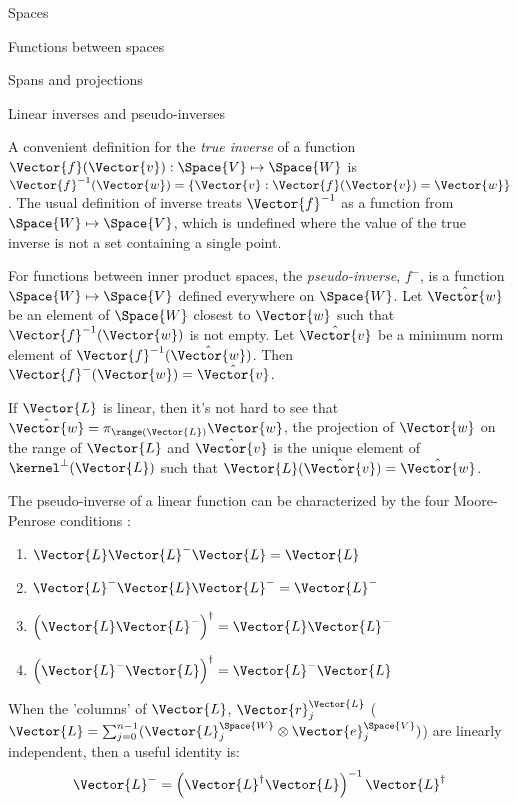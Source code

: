 \begin{plSection}{Spaces}
\begin{plSection}{Functions between spaces}
\begin{plSection}{Spans and projections}
\end{plSection}%
\begin{plSection}{Linear inverses and pseudo-inverses}
\label{sec:Linear-inverses-and-pseudo-inverses}

A convenient definition for the \textit{true inverse}
of a function $\Vector{f}(\Vector{v}):\Space{V} \mapsto \Space{W}$ is
$\Vector{f}^{-1}(\Vector{w}) = \left\{ \Vector{v} : \Vector{f}(\Vector{v}) = \Vector{w} \right\}$.
The usual definition of inverse treats $\Vector{f}^{-1}$
as a function from $\Space{W} \mapsto \Space{V}$,
which is undefined where the value of the true
inverse is not a set containing a single point.

For functions between inner product spaces,
the \textit{pseudo-inverse}, $f^{-}$, is a function $\Space{W} \mapsto \Space{V}$
defined everywhere on $\Space{W}$.
Let $\hat{\Vector{w}}$ be an element of $\Space{W}$ closest to $\Vector{w}$
such that $\Vector{f}^{-1}(\Vector{w})$ is not empty.
Let $\hat{\Vector{v}}$ be a minimum norm element of $\Vector{f}^{-1}(\hat{\Vector{w}})$.
Then $\Vector{f}^{-}(\Vector{w}) = \hat{\Vector{v}}$.

If $\Vector{L}$ is linear, then it's not hard to see that
$\hat{\Vector{w}} = \pi_{\range(\Vector{L})} \Vector{w}$, the projection of $\Vector{w}$
on the range of $\Vector{L}$
and
$\hat{\Vector{v}}$ is the unique element of $\kernel^{\perp}(\Vector{L})$
such that $\Vector{L}(\hat{\Vector{v}}) = \hat{\Vector{w}}$.

The pseudo-inverse of a linear function can be characterized
by the four Moore-Penrose 
conditions :
\begin{enumerate}
\item $\Vector{L} \Vector{L}^{-} \Vector{L} = \Vector{L}$
\item $\Vector{L}^{-} \Vector{L} \Vector{L}^{-} = \Vector{L}^{-}$
\item $\left( \Vector{L} \Vector{L}^{-} \right)^{\dagger} = \Vector{L} \Vector{L}^{-}$
\item $\left( \Vector{L}^{-} \Vector{L} \right)^{\dagger} = \Vector{L}^{-} \Vector{L}$
\end{enumerate}

When the 'columns' of $\Vector{L}$, $\Vector{r}_j^{\Vector{L}}$
($\Vector{L} = \sum_{j=0}^{n-1} ( \Vector{L}_j^{\Space{W}} \otimes \Vector{e}_j^{\Space{V}} )$)
are linearly independent,
then a useful identity is:
\begin{equation}
\label{eq:full-rank-pseudo-inverse}
\Vector{L}^{-} = \left( \Vector{L}^{\dagger} \Vector{L} \right)^{-1} \Vector{L}^{\dagger}
\end{equation}


\end{plSection}
\end{plSection}
\end{plSection}
